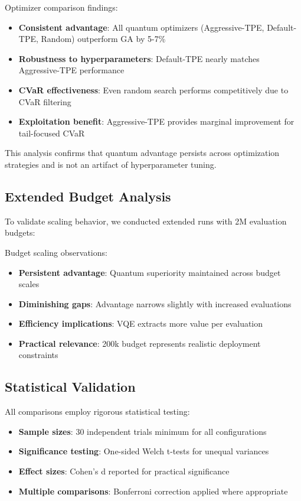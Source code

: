 

Optimizer comparison findings:
\begin{itemize}
    \item \textbf{Consistent advantage}: All quantum optimizers (Aggressive-TPE, Default-TPE, Random) outperform GA by 5-7\%
    \item \textbf{Robustness to hyperparameters}: Default-TPE nearly matches Aggressive-TPE performance
    \item \textbf{CVaR effectiveness}: Even random search performs competitively due to CVaR filtering
    \item \textbf{Exploitation benefit}: Aggressive-TPE provides marginal improvement for tail-focused CVaR
\end{itemize}

This analysis confirms that quantum advantage persists across optimization strategies and is not an artifact of hyperparameter tuning.

\subsection{Extended Budget Analysis}
\label{sec:appendix_extended_budget}

To validate scaling behavior, we conducted extended runs with 2M evaluation budgets:



Budget scaling observations:
\begin{itemize}
    \item \textbf{Persistent advantage}: Quantum superiority maintained across budget scales
    \item \textbf{Diminishing gaps}: Advantage narrows slightly with increased evaluations
    \item \textbf{Efficiency implications}: VQE extracts more value per evaluation
    \item \textbf{Practical relevance}: 200k budget represents realistic deployment constraints
\end{itemize}

\subsection{Statistical Validation}
\label{sec:appendix_statistics}

All comparisons employ rigorous statistical testing:
\begin{itemize}
    \item \textbf{Sample sizes}: 30 independent trials minimum for all configurations
    \item \textbf{Significance testing}: One-sided Welch t-tests for unequal variances
    \item \textbf{Effect sizes}: Cohen's d reported for practical significance
    \item \textbf{Multiple comparisons}: Bonferroni correction applied where appropriate
\end{itemize}

